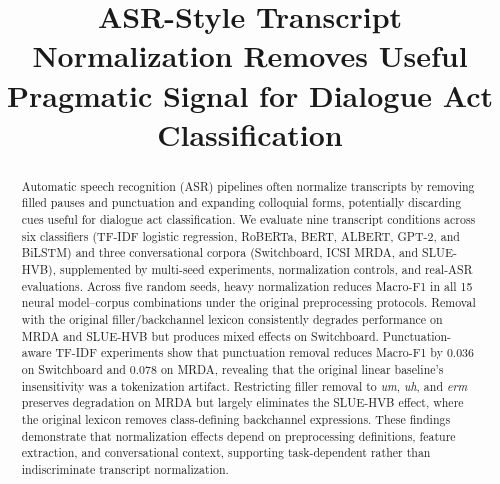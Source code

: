 \documentclass[conference]{IEEEtran}
\begin{document}
\title{ASR-Style Transcript Normalization Removes Useful Pragmatic Signal for Dialogue Act Classification}

\author{
\and
{}
}

\maketitle

\begin{abstract}
Automatic speech recognition (ASR) pipelines often
normalize transcripts by removing filled pauses
and punctuation and expanding colloquial forms,
potentially discarding cues useful for dialogue
act classification.
We evaluate nine transcript conditions across six
classifiers (TF-IDF logistic regression, RoBERTa,
BERT, ALBERT, GPT-2, and BiLSTM) and three conversational
corpora (Switchboard, ICSI MRDA, and SLUE-HVB),
supplemented by multi-seed experiments, normalization
controls, and real-ASR evaluations. Across five random
seeds, heavy normalization reduces Macro-F1 in all
15 neural model--corpus combinations under the original
preprocessing protocols. Removal with the original filler/backchannel lexicon
consistently degrades performance on MRDA and SLUE-HVB
but produces mixed effects on Switchboard. Punctuation-aware TF-IDF
experiments show that punctuation removal reduces
Macro-F1 by 0.036 on Switchboard and 0.078 on MRDA,
revealing that the original linear baseline's
insensitivity was a tokenization artifact. Restricting
filler removal to \textit{um}, \textit{uh}, and
\textit{erm} preserves degradation on MRDA but largely
eliminates the SLUE-HVB effect, where the original
lexicon removes class-defining backchannel expressions.
These findings demonstrate that normalization effects
depend on preprocessing definitions, feature extraction,
and conversational context, supporting task-dependent
rather than indiscriminate transcript normalization.
\end{abstract}
\end{document}
